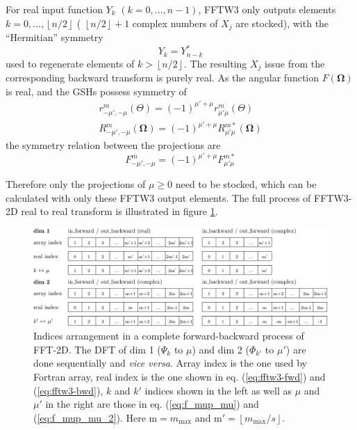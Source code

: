 For real input function $Y_{k}$ $(k=0,\ldots,n-1)$, FFTW3 only outputs
elements $k=0,\ldots,\left\lfloor n/2\right\rfloor $ ( $\left\lfloor n/2\right\rfloor +1$
complex numbers of $X_{j}$ are stocked), with the “Hermitian” symmetry
\begin{equation}
Y_{k}=Y_{n-k}^{*}\label{eq:yk_conjg}
\end{equation}
used to regenerate elements of $k>\left\lfloor n/2\right\rfloor $.
The resulting $X_{j}$ issue from the corresponding backward transform
is purely real. As the angular function $F(\mathbf{\Omega})$ is real,
and the GSHs possess symmetry \citep{Gray-Gubbins,Messiah} of
\begin{equation}
\begin{array}{c}
r_{-\mu',-\mu}^{m}(\Theta)=\left(-1\right)^{\mu'+\mu}r_{\mu'\mu}^{m}(\Theta)\\
R_{-\mu',-\mu}^{m}(\mathbf{\Omega})=\left(-1\right)^{\mu'+\mu}R_{\mu'\mu}^{m*}(\mathbf{\Omega})
\end{array}
\end{equation}
the symmetry relation between the projections are
\begin{equation}
F_{-\mu',-\mu}^{m}=\left(-1\right)^{\mu'+\mu}F_{\mu'\mu}^{m*}\label{eq:symm_f_m_mup_mu}
\end{equation}


Therefore only the projections of $\mu\geq0$ need to be stocked,
which can be calculated with only these FFTW3 output elements. The
full process of FFTW3-2D real to real transform is illustrated in
figure \ref{fig:FFTW3-2D-indices}.

\begin{figure}[h]
\centering{}%
\begin{minipage}[t]{1\textwidth}%
\begin{center}
\includegraphics[width=1\textwidth]{_figure/fftw3_indices}
\par\end{center}

\caption[Indices arrangement in a complete forward-backward process of FFT-2D]{Indices arrangement in a complete forward-backward process of FFT-2D.
The DFT of dim 1 ($\Psi_{k}$ to $\mu$) and dim 2 ($\Phi_{k'}$ to
$\mu'$) are done sequentially and \emph{vice versa}. Array index
is the one used by Fortran array, real index is the one shown in eq.
(\ref{eq:fftw3-fwd}) and (\ref{eq:fftw3-bwd}), $k$ and $k'$ indices
shown in the left as well as $\mu$ and $\mu'$ in the right are those
in eq. (\ref{eq:f_mup_mu}) and (\ref{eq:f_mup_mu_2}). Here $\mathrm{m}=m_{\mathrm{max}}$
and $\mathrm{m}'=\left\lfloor m_{\mathrm{max}}/s\right\rfloor $.
\label{fig:FFTW3-2D-indices}}
%
\end{minipage}
\end{figure}


